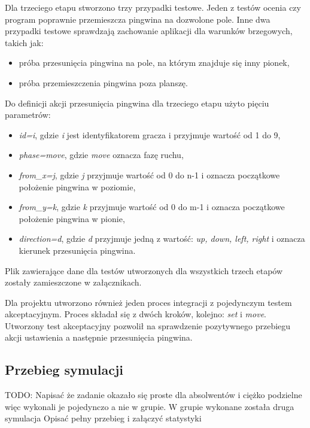 Dla trzeciego etapu stworzono trzy przypadki testowe.
Jeden z testów ocenia czy program poprawnie przemieszcza pingwina na dozwolone pole.
Inne dwa przypadki testowe sprawdzają zachowanie aplikacji dla warunków brzegowych, takich jak:
\begin{itemize}
    \item próba przesunięcia pingwina na pole, na którym znajduje się inny pionek,
    \item próba przemieszczenia pingwina poza planszę.
\end{itemize}

Do definicji akcji przesunięcia pingwina dla trzeciego etapu użyto pięciu parametrów:
\begin{itemize}
    \item \textit{id=i}, gdzie \textit{i} jest identyfikatorem gracza i przyjmuje wartość od 1 do 9,
    \item \textit{phase=move}, gdzie \textit{move} oznacza fazę ruchu,
    \item \textit{from\_x=j}, gdzie \textit{j} przyjmuje wartość od 0 do n-1 i oznacza początkowe położenie pingwina w poziomie,
    \item \textit{from\_y=k}, gdzie \textit{k} przyjmuje wartość od 0 do m-1 i oznacza początkowe położenie pingwina w pionie,
    \item \textit{direction=d}, gdzie \textit{d} przyjmuje jedną z wartość: \textit{up, down, left, right} i oznacza kierunek przesunięcia pingwina.
\end{itemize}

Plik zawierające dane dla testów utworzonych dla wszystkich trzech etapów zostały zamieszczone w załącznikach.

Dla projektu utworzono również jeden proces integracji z pojedynczym testem akceptacyjnym.
Proces składał się z dwóch kroków, kolejno: \textit{set} i \textit{move}.
Utworzony test akceptacyjny pozwolił na sprawdzenie pozytywnego przebiegu akcji ustawienia a następnie przesunięcia pingwina.


\subsection{Przebieg symulacji}
\label{penguins_simulation}

TODO: Napisać że zadanie okazało się proste dla absolwentów i ciężko podzielne więc wykonali je pojedynczo a nie w grupie.
W grupie wykonane została druga symulacja
Opisać pełny przebieg i załączyć statystyki

